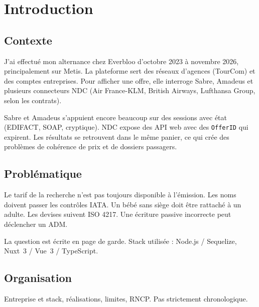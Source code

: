 \chapter{Introduction}
\label{chap:introduction}

\section{Contexte}

J'ai effectué mon alternance chez Everbloo d'octobre 2023 à novembre 2026, principalement sur Metis. La plateforme sert des réseaux d'agences (TourCom) et des comptes entreprises. Pour afficher une offre, elle interroge Sabre, Amadeus et plusieurs connecteurs NDC (Air France-KLM, British Airways, Lufthansa Group, selon les contrats).

Sabre et Amadeus s'appuient encore beaucoup sur des sessions avec état (EDIFACT, SOAP, cryptique). NDC expose des API web avec des \texttt{OfferID} qui expirent. Les résultats se retrouvent dans le même panier, ce qui crée des problèmes de cohérence de prix et de dossiers passagers.

\section{Problématique}

Le tarif de la recherche n'est pas toujours disponible à l'émission. Les noms doivent passer les contrôles IATA. Un bébé sans siège doit être rattaché à un adulte. Les devises suivent ISO 4217. Une écriture passive incorrecte peut déclencher un ADM.

La question est écrite en page de garde. Stack utilisée : Node.js / Sequelize, Nuxt~3 / Vue~3 / TypeScript.

\section{Organisation}

Entreprise et stack, réalisations, limites, RNCP. Pas strictement chronologique.
